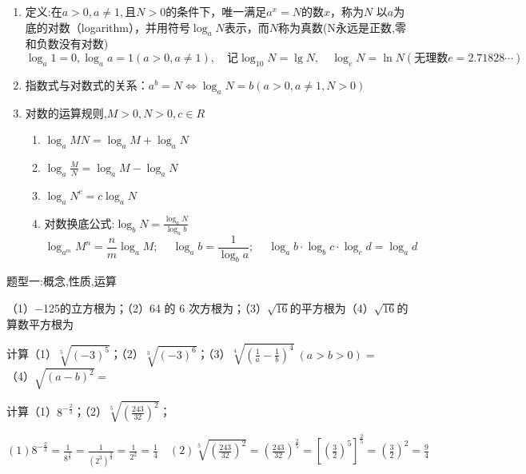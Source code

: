 \begin{enumerate}
    \item 定义:在$a>0,a\ne1,$且$N>0$的条件下，唯一满足$a^x=N$的数$x$，称为$N$
    以$a$为底的对数（logarithm），并用符号$\log_a {N}$表示，而$N$称为真数(N永远是正数,零和负数没有对数)
    $$\log_a{1}=0,\log_a{a}=1(a>0,a\ne1),\quad \text{记} \log_{10}{N}=\lg{N},\quad \log_e{N}=\ln{N}(\text{无理数}e=2.71828\cdots)$$
    \item 指数式与对数式的关系：$a^b=N \Leftrightarrow \log_a{N}=b(a>0,a\ne1,N>0)$
    \item 对数的运算规则,$M>0,N>0,c\in R$
    \begin{enumerate}
        \item $\log_a{MN}=\log_a{M}+\log_a{N}$
        \item $\log_a{\frac{M}{N}}=\log_a{M}-\log_a{N}$
        \item $\log_a{N^c}=c\log_a{N}$
        \item 对数换底公式:\quad $\displaystyle \log_b{N}=\frac{\log_a{N}}{\log_a{b}}$
        $$\log_{a^m}{M^n}=\frac{n}{m}\log_a{M};\ \quad \log_a{b}=\frac{1}{\log_b{a}};\ \quad \log_a{b}\cdot \log_b{c}\cdot \log_c{d} = \log_a{d}$$
    \end{enumerate}
\end{enumerate}

\begin{tcolorbox} 
    \centering
    题型一:概念,性质,运算
\end{tcolorbox}

\begin{problem}
    （1）−125的立方根为；（2）64 的 6 次方根为；（3）$\sqrt{16}$的平方根为（4）$\sqrt{16}$的算数平方根为
\end{problem}

\begin{problem}
    计算（1）$\sqrt[5]{(-3)^5}$；（2）$\sqrt[3]{(-3)^6}$；（3）$\displaystyle \sqrt[4]{(\frac{1}{a}-\frac{1}{b})^4}\ (a>b>0)=$
    （4）$\sqrt{(a-b)^2}=$
\end{problem}

\begin{problem}
    计算（1）$\displaystyle 8^{-\frac{2}{3}}$；（2）$\displaystyle \sqrt[5]{(\frac{243}{32})^2}$；
    \begin{jiexi}
        $\displaystyle (1) 8^{-\frac{2}{3}}=\frac{1}{8^{\frac{2}{3}}}=\frac{1}{(2^3)^{\frac{2}{3}}}=\frac{1}{2^2}=\frac{1}{4}\quad (2)\sqrt[5]{(\frac{243}{32})^2}=(\frac{243}{32})^{\frac{2}{5}}=\left[
            (\frac{3}{2})^5
            \right]^{\frac{2}{5}}=(\frac{3}{2})^2=\frac{9}{4} $
    \end{jiexi}
\end{problem}

